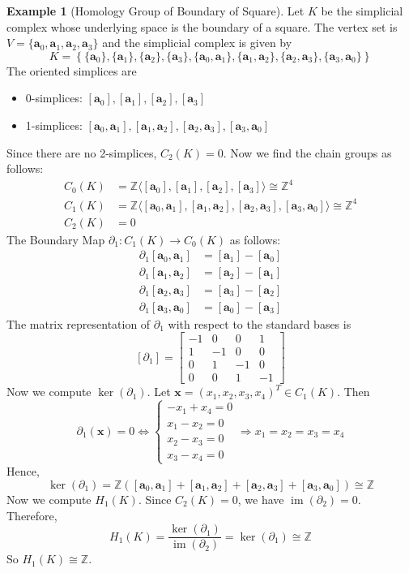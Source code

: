 \documentclass[12pt,oneside,reqno]{amsart}
\theoremstyle{plain}
\theoremstyle{definition}
\newtheorem{example}{Example}[section]
\theoremstyle{remark}
\newcommand{\0}{{\textbf{0}}}
\begin{document}
\begin{example}[Homology Group of Boundary of Square]
Let $K$ be the simplicial complex whose underlying space is the boundary of a square. The vertex set is $V = \{\bm{a}_0, \bm{a}_1, \bm{a}_2, \bm{a}_3\}$ and the simplicial complex is given by
\[
K = \left\{
\{\bm{a}_0\}, \{\bm{a}_1\}, \{\bm{a}_2\}, \{\bm{a}_3\},
\{\bm{a}_0, \bm{a}_1\}, \{\bm{a}_1, \bm{a}_2\}, \{\bm{a}_2, \bm{a}_3\}, \{\bm{a}_3, \bm{a}_0\}
\right\}
\]
The oriented simplices are
\begin{itemize}
    \item 0-simplices: $[\bm{a}_0], [\bm{a}_1], [\bm{a}_2], [\bm{a}_3]$
    \item 1-simplices: $[\bm{a}_0, \bm{a}_1], [\bm{a}_1, \bm{a}_2], [\bm{a}_2, \bm{a}_3], [\bm{a}_3, \bm{a}_0]$
\end{itemize}
Since there are no 2-simplices, $C_2(K) = 0$. Now we find the chain groups as follows:
\[
\begin{aligned}
C_0(K) &= \mathbb{Z}\langle [\bm{a}_0], [\bm{a}_1], [\bm{a}_2], [\bm{a}_3] \rangle \cong \mathbb{Z}^4 \\
C_1(K) &= \mathbb{Z}\langle [\bm{a}_0, \bm{a}_1], [\bm{a}_1, \bm{a}_2], [\bm{a}_2, \bm{a}_3], [\bm{a}_3, \bm{a}_0] \rangle \cong \mathbb{Z}^4 \\
C_2(K) &= 0
\end{aligned}
\]
The Boundary Map $\partial_1 \colon C_1(K) \to C_0(K)$ as follows:
\[
\begin{aligned}
\partial_1[\bm{a}_0, \bm{a}_1] &= [\bm{a}_1] - [\bm{a}_0] \\
\partial_1[\bm{a}_1, \bm{a}_2] &= [\bm{a}_2] - [\bm{a}_1] \\
\partial_1[\bm{a}_2, \bm{a}_3] &= [\bm{a}_3] - [\bm{a}_2] \\
\partial_1[\bm{a}_3, \bm{a}_0] &= [\bm{a}_0] - [\bm{a}_3]
\end{aligned}
\]
The matrix representation of $\partial_1$ with respect to the standard bases is
\[
[\partial_1] = 
\begin{bmatrix}
-1 & 0 & 0 & 1 \\
1 & -1 & 0 & 0 \\
0 & 1 & -1 & 0 \\
0 & 0 & 1 & -1
\end{bmatrix}
\]
Now we compute $\ker(\partial_1)$. Let $\bm{x} = (x_1, x_2, x_3, x_4)^T \in C_1(K)$. Then
\[
\partial_1(\bm{x}) = 0 \Longleftrightarrow
\begin{cases}
-x_1 + x_4 = 0 \\
x_1 - x_2 = 0 \\
x_2 - x_3 = 0 \\
x_3 - x_4 = 0
\end{cases}
\Rightarrow x_1 = x_2 = x_3 = x_4
\]
Hence,
\[
\ker(\partial_1) = \mathbb{Z}\left( [\bm{a}_0, \bm{a}_1] + [\bm{a}_1, \bm{a}_2] + [\bm{a}_2, \bm{a}_3] + [\bm{a}_3, \bm{a}_0] \right) \cong \mathbb{Z}
\]
Now we compute $H_1(K)$. Since $C_2(K) = 0$, we have $\operatorname{im}(\partial_2) = 0$. Therefore,
\[
H_1(K) = \frac{\ker(\partial_1)}{\operatorname{im}(\partial_2)} = \ker(\partial_1) \cong \mathbb{Z}
\]
So $H_1(K) \cong \mathbb{Z}$.
\end{example}
\end{document}
